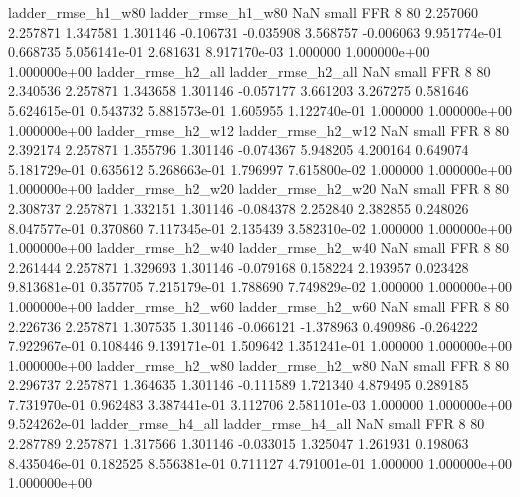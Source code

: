       ladder_rmse_h1_w80       ladder_rmse_h1_w80                   NaN      small      FFR                 8 80 2.257060       2.257871 1.347581       1.301146   -0.106731     -0.035908      3.568757    -0.006063   9.951774e-01  0.668735 5.056141e-01     2.681631   8.917170e-03            1.000000    1.000000e+00        1.000000e+00
      ladder_rmse_h2_all       ladder_rmse_h2_all                   NaN      small      FFR                 8 80 2.340536       2.257871 1.343658       1.301146   -0.057177      3.661203      3.267275     0.581646   5.624615e-01  0.543732 5.881573e-01     1.605955   1.122740e-01            1.000000    1.000000e+00        1.000000e+00
      ladder_rmse_h2_w12       ladder_rmse_h2_w12                   NaN      small      FFR                 8 80 2.392174       2.257871 1.355796       1.301146   -0.074367      5.948205      4.200164     0.649074   5.181729e-01  0.635612 5.268663e-01     1.796997   7.615800e-02            1.000000    1.000000e+00        1.000000e+00
      ladder_rmse_h2_w20       ladder_rmse_h2_w20                   NaN      small      FFR                 8 80 2.308737       2.257871 1.332151       1.301146   -0.084378      2.252840      2.382855     0.248026   8.047577e-01  0.370860 7.117345e-01     2.135439   3.582310e-02            1.000000    1.000000e+00        1.000000e+00
      ladder_rmse_h2_w40       ladder_rmse_h2_w40                   NaN      small      FFR                 8 80 2.261444       2.257871 1.329693       1.301146   -0.079168      0.158224      2.193957     0.023428   9.813681e-01  0.357705 7.215179e-01     1.788690   7.749829e-02            1.000000    1.000000e+00        1.000000e+00
      ladder_rmse_h2_w60       ladder_rmse_h2_w60                   NaN      small      FFR                 8 80 2.226736       2.257871 1.307535       1.301146   -0.066121     -1.378963      0.490986    -0.264222   7.922967e-01  0.108446 9.139171e-01     1.509642   1.351241e-01            1.000000    1.000000e+00        1.000000e+00
      ladder_rmse_h2_w80       ladder_rmse_h2_w80                   NaN      small      FFR                 8 80 2.296737       2.257871 1.364635       1.301146   -0.111589      1.721340      4.879495     0.289185   7.731970e-01  0.962483 3.387441e-01     3.112706   2.581101e-03            1.000000    1.000000e+00        9.524262e-01
      ladder_rmse_h4_all       ladder_rmse_h4_all                   NaN      small      FFR                 8 80 2.287789       2.257871 1.317566       1.301146   -0.033015      1.325047      1.261931     0.198063   8.435046e-01  0.182525 8.556381e-01     0.711127   4.791001e-01            1.000000    1.000000e+00        1.000000e+00
